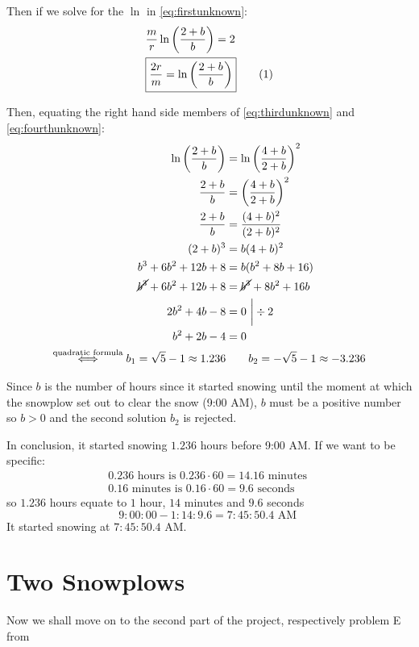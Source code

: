 \documentclass[a4paper,12pt]{article}
\renewcommand*{\textnormal}[1]{\text{ #1 }}
\newcommand\numberthis{\addtocounter{equation}{1}\tag{\theequation}}
\begin{document}
    Then if we solve for the $\ln$ in \eqref{eq:firstunknown}:
    \begin{align*}
        &\frac{m}{r} \ln\left(\frac{2+b}{b}\right) = 2 \\
        &\boxed{\frac{2r}{m} = \ln\left(\frac{2+b}{b}\right)} \numberthis \label{eq:fourthunknown}
    \end{align*}

    Then, equating the right hand side members of \eqref{eq:thirdunknown} and \eqref{eq:fourthunknown}:
    \begin{align*}
        \ln\left(\frac{2+b}{b}\right) &= \ln\left(\frac{4+b}{2+b}\right)^2 \\
        \frac{2+b}{b} &= \left(\frac{4+b}{2+b}\right)^2 \\
        \frac{2+b}{b} &= \frac{(4+b)^2}{(2+b)^2} \\
        (2+b)^3 &= b(4+b)^2 \\
        b^3 + 6b^2 + 12b + 8 &= b (b^2 + 8b + 16) \\
        \cancel{b^3} + 6b^2 + 12b + 8 &= \cancel{b^3} + 8b^2 + 16b \\
         2b^2 +  4b - 8 &= 0 \ \bigg| \div 2 \\ 
         b^2 + 2b - 4 &= 0 \\
         \overset{\text{quadratic formula}}{\iff} b_1 = \sqrt{5} - 1 \approx 1.236 &\qquad b_2 = -\sqrt 5 - 1 \approx - 3.236
    \end{align*}

    Since $b$ is the number of hours since it started snowing until the moment at which the snowplow set out to clear the snow (9:00 AM), $b$ must be a positive number so $b >0$ and the second solution $b_2$ is rejected.

    In conclusion, it started snowing $1.236$ hours before 9:00 AM. If we want to be specific:
    \begin{align*}
        0.236 \textnormal{hours is} 0.236 \cdot 60 = 14.16 \textnormal{minutes} \\
        0.16 \textnormal{minutes is} 0.16 \cdot 60 = 9.6 \textnormal{seconds}
    \end{align*}
    so $1.236$ hours equate to $1$ hour, $14$ minutes and $9.6$ seconds
    \[
        9{:}00{:}00 - 1{:}14{:}9.6 = 7{:}45{:}50.4 \textnormal{AM}
    \]
   It started snowing at $7{:}45{:}50.4$ AM.

\setcounter{section}{0}
\part{Two Snowplows}
Now we shall move on to the second part of the project, respectively problem E from \cite[pp.~84--85]{Kent_Nagle2018-ig}
\end{document}
